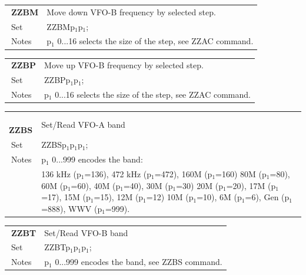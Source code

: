 \documentclass[12pt]{book}
\begin{document}
\begin{center}
\begin{tabular}{|p{2cm}|p{11cm}|}
\toprule
$\phantom{\Big|}$\textbf{\large ZZBM} & Move down VFO-B frequency by selected step. \\\cline{1-2}
$\phantom{\Big|}${\large Set} & {ZZBMp$_1$p$_1$;} \\\hline
$\phantom{\Big|}${\large Notes} & \multicolumn{1}{|p{11cm}|}{p$_1$ 0...16 selects the size of the step, see ZZAC command.} \\
\bottomrule
\end{tabular}
\end{center}

\begin{center}
\begin{tabular}{|p{2cm}|p{11cm}|}
\toprule
$\phantom{\Big|}$\textbf{\large ZZBP} & Move up VFO-B frequency by selected step. \\\cline{1-2}
$\phantom{\Big|}${\large Set} & {ZZBPp$_1$p$_1$;} \\\hline
$\phantom{\Big|}${\large Notes} & \multicolumn{1}{|p{11cm}|}{p$_1$ 0...16 selects the size of the step, see ZZAC command.} \\
\bottomrule
\end{tabular}
\end{center}

\begin{center}
\begin{tabular}{|p{2cm}|p{11cm}|}
\toprule
$\phantom{\Big|}$\textbf{\large ZZBS} & Set/Read VFO-A band \\\cline{1-2}
$\phantom{\Big|}${\large Set} & {ZZBSp$_1$p$_1$p$_1$;} \\\hline
$\phantom{\Big|}${\large Notes} & \multicolumn{1}{|p{11cm}|}{p$_1$ 0...999 encodes the band:} \\
 & \multicolumn{1}{|p{11cm}|}{136 kHz (p$_1$=136), 472 kHz (p$_1$=472), 160M (p$_1$=160) 80M (p$_1$=80), 60M (p$_1$=60), 40M (p$_1$=40), 30M (p$_1$=30) 20M (p$_1$=20), 17M (p$_1$=17), 15M (p$_1$=15), 12M (p$_1$=12) 10M (p$_1$=10), 6M (p$_1$=6), Gen (p$_1$=888), WWV (p$_1$=999).} \\
\bottomrule
\end{tabular}
\end{center}

\begin{center}
\begin{tabular}{|p{2cm}|p{11cm}|}
\toprule
$\phantom{\Big|}$\textbf{\large ZZBT} & Set/Read VFO-B band \\\cline{1-2}
$\phantom{\Big|}${\large Set} & {ZZBTp$_1$p$_1$p$_1$;} \\\hline
$\phantom{\Big|}${\large Notes} & \multicolumn{1}{|p{11cm}|}{p$_1$ 0...999 encodes the band, see ZZBS command.} \\
\bottomrule
\end{tabular}
\end{center}
\end{document}
